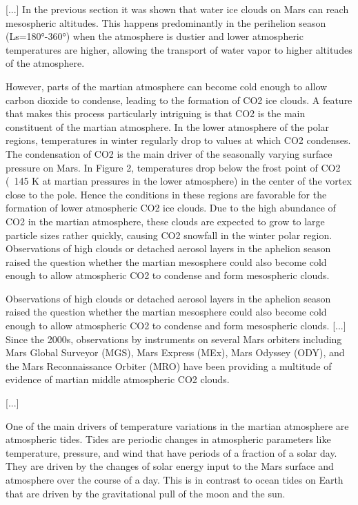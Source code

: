 \documentclass[a4paper,10pt,openany,oneside]{memoir}
\begin{document}
[...]
In the previous section it was shown that water ice clouds on Mars can reach mesospheric altitudes. This happens predominantly in the perihelion season (Ls=180°-360°) when the atmosphere is dustier and lower atmospheric temperatures are higher, allowing the transport of water vapor to higher altitudes of the atmosphere.

However, parts of the martian atmosphere can become cold enough to allow carbon dioxide to condense, leading to the formation of CO2 ice clouds. A feature that makes this process particularly intriguing is that CO2 is the main constituent of the martian atmosphere. In the lower atmosphere of the polar regions, temperatures in winter regularly drop to values at which CO2 condenses. The condensation of CO2 is the main driver of the seasonally varying surface pressure on Mars. In Figure 2, temperatures drop below the frost point of CO2 (~145 K at martian pressures in the lower atmosphere) in the center of the vortex close to the pole. Hence the conditions in these regions are favorable for the formation of lower atmospheric CO2 ice clouds. Due to the high abundance of CO2 in the martian atmosphere, these clouds are expected to grow to large particle sizes rather quickly, causing CO2 snowfall in the winter polar region. Observations of high clouds or detached aerosol layers in the aphelion season raised the question whether the martian mesosphere could also become cold enough to allow atmospheric CO2 to condense and form mesospheric clouds.

Observations of high clouds or detached aerosol layers in the aphelion season raised the question whether the martian mesosphere could also become cold enough to allow atmospheric CO2 to condense and form mesospheric clouds. [...] Since the 2000s, observations by instruments on several Mars orbiters including Mars Global Surveyor (MGS), Mars Express (MEx), Mars Odyssey (ODY), and the Mars Reconnaissance Orbiter (MRO) have been providing a multitude of evidence of martian middle atmospheric CO2 clouds.

[...]

One of the main drivers of temperature variations in the martian atmosphere are atmospheric tides. Tides are periodic changes in atmospheric parameters like temperature, pressure, and wind that have periods of a fraction of a solar day. They are driven by the changes of solar energy input to the Mars surface and atmosphere over the course of a day. This is in contrast to ocean tides on Earth that are driven by the gravitational pull of the moon and the sun. 
\end{document}

